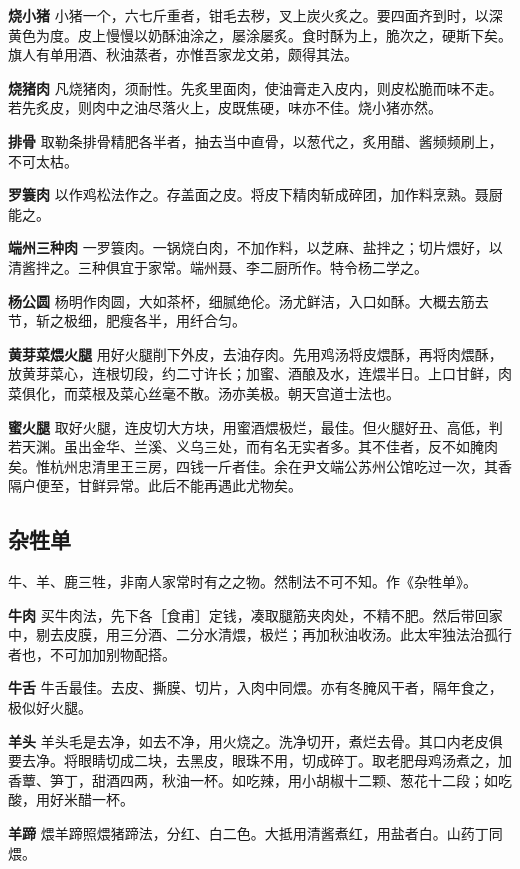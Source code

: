 \documentclass[]{article}
\begin{document}
\textbf{烧小猪}
小猪一个，六七斤重者，钳毛去秽，叉上炭火炙之。要四面齐到时，以深黄色为度。皮上慢慢以奶酥油涂之，屡涂屡炙。食时酥为上，脆次之，硬斯下矣。旗人有单用酒、秋油蒸者，亦惟吾家龙文弟，颇得其法。

\textbf{烧猪肉}
凡烧猪肉，须耐性。先炙里面肉，使油膏走入皮内，则皮松脆而味不走。若先炙皮，则肉中之油尽落火上，皮既焦硬，味亦不佳。烧小猪亦然。

\textbf{排骨}
取勒条排骨精肥各半者，抽去当中直骨，以葱代之，炙用醋、酱频频刷上，不可太枯。

\textbf{罗簑肉}
以作鸡松法作之。存盖面之皮。将皮下精肉斩成碎团，加作料烹熟。聂厨能之。

\textbf{端州三种肉}
一罗簑肉。一锅烧白肉，不加作料，以芝麻、盐拌之；切片煨好，以清酱拌之。三种俱宜于家常。端州聂、李二厨所作。特令杨二学之。

\textbf{杨公圆}
杨明作肉圆，大如茶杯，细腻绝伦。汤尤鲜洁，入口如酥。大概去筋去节，斩之极细，肥瘦各半，用纤合匀。

\textbf{黄芽菜煨火腿}
用好火腿削下外皮，去油存肉。先用鸡汤将皮煨酥，再将肉煨酥，放黄芽菜心，连根切段，约二寸许长；加蜜、酒酿及水，连煨半日。上口甘鲜，肉菜俱化，而菜根及菜心丝毫不散。汤亦美极。朝天宫道士法也。

\textbf{蜜火腿}
取好火腿，连皮切大方块，用蜜酒煨极烂，最佳。但火腿好丑、高低，判若天渊。虽出金华、兰溪、义乌三处，而有名无实者多。其不佳者，反不如腌肉矣。惟杭州忠清里王三房，四钱一斤者佳。余在尹文端公苏州公馆吃过一次，其香隔户便至，甘鲜异常。此后不能再遇此尤物矣。

\hypertarget{header-n19}{%
\subsection{杂牲单}\label{header-n19}}

牛、羊、鹿三牲，非南人家常时有之之物。然制法不可不知。作《杂牲单》。

\textbf{牛肉}
买牛肉法，先下各［食甫］定钱，凑取腿筋夹肉处，不精不肥。然后带回家中，剔去皮膜，用三分酒、二分水清煨，极烂；再加秋油收汤。此太牢独法治孤行者也，不可加加别物配搭。

\textbf{牛舌}
牛舌最佳。去皮、撕膜、切片，入肉中同煨。亦有冬腌风干者，隔年食之，极似好火腿。

\textbf{羊头}
羊头毛是去净，如去不净，用火烧之。洗净切开，煮烂去骨。其口内老皮俱要去净。将眼睛切成二块，去黑皮，眼珠不用，切成碎丁。取老肥母鸡汤煮之，加香蕈、笋丁，甜酒四两，秋油一杯。如吃辣，用小胡椒十二颗、葱花十二段；如吃酸，用好米醋一杯。

\textbf{羊蹄}
煨羊蹄照煨猪蹄法，分红、白二色。大抵用清酱煮红，用盐者白。山药丁同煨。
\end{document}
